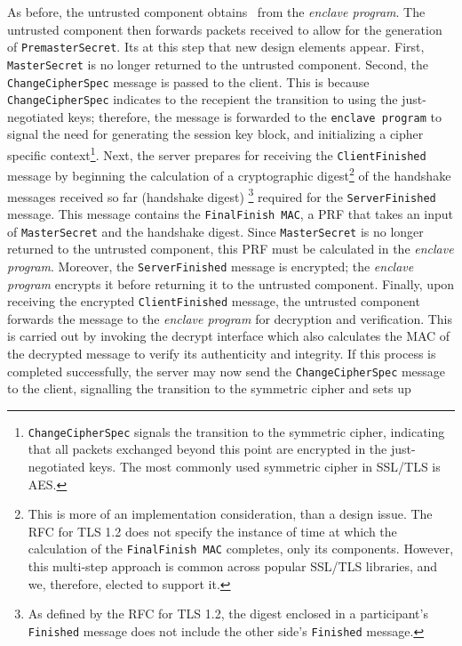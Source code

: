 \documentclass[../../main.tex]{subfiles}
\begin{document}
As before, the untrusted component obtains \srandom~from the
\textit{enclave program}. The untrusted component then forwards
packets received to allow for the generation of
\texttt{PremasterSecret}. Its at this step that new design elements
appear. First, \texttt{MasterSecret} is no longer returned to the
untrusted component. Second, the \texttt{Change\-CipherSpec} message
is passed to the client. This is because \texttt{ChangeCipherSpec}
indicates to the recepient the transition to using the just-negotiated
keys; therefore, the message is forwarded to the \texttt{enclave
  program} to signal the need for generating the session key block,
and initializing a cipher specific
context\footnote{\texttt{ChangeCipherSpec} signals the transition to
  the symmetric cipher, indicating that all packets exchanged beyond
  this point are encrypted in the just-negotiated keys. The most
  commonly used symmetric cipher in SSL/TLS is AES.}. Next, the server
prepares for receiving the \texttt{ClientFinished} message by
beginning the calculation of a cryptographic digest\footnote{This is
  more of an implementation consideration, than a design issue. The
  RFC for TLS 1.2 does not specify the instance of time at which the
  calculation of the \texttt{FinalFinish MAC} completes, only its
  components. However, this multi-step approach is common across
  popular SSL/TLS libraries, and we, therefore, elected to support
  it.} of the handshake messages received so far (handshake digest)
\footnote{As defined by the RFC for TLS 1.2, the digest enclosed in a
  participant's \texttt{Finished} message does not include the other
  side's \texttt{Finished} message.} required for the
\texttt{ServerFinished} message. This message contains the
\texttt{FinalFinish MAC}, a PRF that takes an input of
\texttt{MasterSecret} and the handshake digest. Since
\texttt{MasterSecret} is no longer returned to the untrusted
component, this PRF must be calculated in the \textit{enclave
  program}. Moreover, the \texttt{ServerFinished} message is
encrypted; the \textit{enclave program} encrypts it before returning
it to the untrusted component. Finally, upon receiving the encrypted
\texttt{ClientFinished} message, the untrusted component forwards the
message to the \textit{enclave program} for decryption and
verification. This is carried out by invoking the decrypt interface
which also calculates the MAC of the decrypted message to verify its
authenticity and integrity. If this process is completed successfully,
the server may now send the \texttt{ChangeCipherSpec} message to the
client, signalling the transition to the symmetric cipher and sets up
\end{document}
